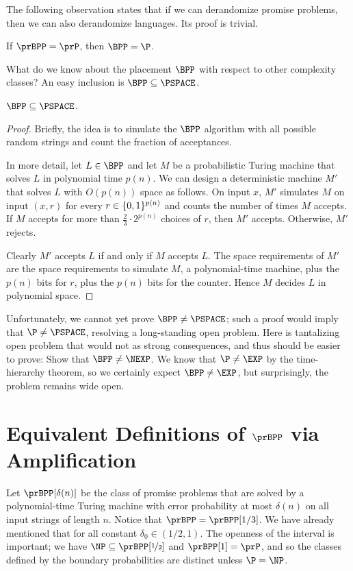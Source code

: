 The following observation states that if we can derandomize promise problems,
then we can also derandomize languages. Its proof is trivial.

\begin{observation}
  If $\prBPP = \prP$, then $\BPP = \P$.
\end{observation}

What do we know about the placement $\BPP$ with respect to other complexity
classes? An easy inclusion is $\BPP \subseteq \PSPACE$.

\begin{proposition}
  $\BPP \subseteq \PSPACE$.
\end{proposition}
\begin{proof}
  Briefly, the idea is to simulate the $\BPP$ algorithm with all possible
  random strings and count the fraction of acceptances.

  In more detail, let $L \in \BPP$ and let $M$ be a probabilistic Turing
  machine that solves $L$ in polynomial time $p(n)$. We can design a
  deterministic machine $M'$ that solves $L$ with $O(p(n))$ space as follows.
  On input $x$, $M'$ simulates $M$ on input $(x, r)$ for every $r \in
  \{0,1\}^{p(n)}$ and counts the number of times $M$ accepts. If $M$ accepts
  for more than $\frac{2}{3} \cdot 2^{p(n)}$ choices of $r$, then $M'$ accepts.
  Otherwise, $M'$ rejects.

  Clearly $M'$ accepts $L$ if and only if $M$ accepts $L$. The space requirements of $M'$ are the space requirements to
  simulate $M$, a polynomial-time machine, plus the $p(n)$ bits for $r$, plus the $p(n)$ bits for the counter. Hence $M$
  decides $L$ in polynomial space.
\end{proof}

Unfortunately, we cannot yet prove $\BPP \ne \PSPACE$; such a proof would imply
that $\P \ne \PSPACE$, resolving a long-standing open problem. Here is
tantalizing open problem that would not as strong consequences, and thus should
be easier to prove: Show that $\BPP \ne \NEXP$. We know that $\P
\ne \EXP$ by the time-hierarchy theorem, so we certainly expect $\BPP \ne
\EXP$, but surprisingly, the problem remains wide open.

\section{Equivalent Definitions of \texorpdfstring{$\prBPP$}{prBPP} via Amplification}

Let $\prBPP[\delta(n)]$ be the class of promise problems that are solved by a
polynomial-time Turing machine with error probability at most $\delta(n)$ on
all input strings of length $n$. Notice that $\prBPP = \prBPP[1/3]$. We have
already mentioned that for all constant $\delta_0 \in (1/2, 1)$.
The openness of the interval is important; we have $\NP \subseteq \prBPP[\nicefrac{1}{2}]$ and $\prBPP[1] = \prP$, and so the classes defined by the boundary probabilities are distinct unless $\P = \NP$.

